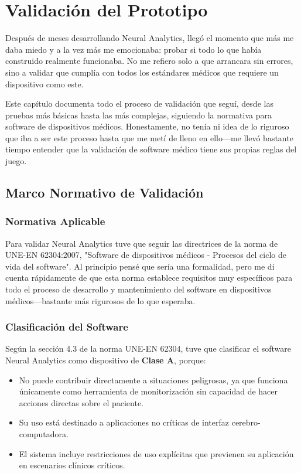 \chapter{Validación del Prototipo}\label{ch:prototype_testing}

Después de meses desarrollando Neural Analytics, llegó el momento que más me daba miedo y a la vez más me emocionaba: probar si todo lo que había construido realmente funcionaba. No me refiero solo a que arrancara sin errores, sino a validar que cumplía con todos los estándares médicos que requiere un dispositivo como este.

Este capítulo documenta todo el proceso de validación que seguí, desde las pruebas más básicas hasta las más complejas, siguiendo la normativa para software de dispositivos médicos. Honestamente, no tenía ni idea de lo riguroso que iba a ser este proceso hasta que me metí de lleno en ello—me llevó bastante tiempo entender que la validación de software médico tiene sus propias reglas del juego.

\section{Marco Normativo de Validación}

\subsection{Normativa Aplicable}

Para validar Neural Analytics tuve que seguir las directrices de la norma de \cite{UNE-EN-62304} UNE-EN 62304:2007, "Software de dispositivos médicos - Procesos del ciclo de vida del software". Al principio pensé que sería una formalidad, pero me di cuenta rápidamente de que esta norma establece requisitos muy específicos para todo el proceso de desarrollo y mantenimiento del software en dispositivos médicos—bastante más rigurosos de lo que esperaba.

\subsection{Clasificación del Software}

Según la sección 4.3 de la norma UNE-EN 62304, tuve que clasificar el software Neural Analytics como dispositivo de \textbf{Clase A}, porque:

\begin{itemize}
    \item No puede contribuir directamente a situaciones peligrosas, ya que funciona únicamente como herramienta de monitorización sin capacidad de hacer acciones directas sobre el paciente.
    \item Su uso está destinado a aplicaciones no críticas de interfaz cerebro-computadora.
    \item El sistema incluye restricciones de uso explícitas que previenen su aplicación en escenarios clínicos críticos.
\end{itemize}

